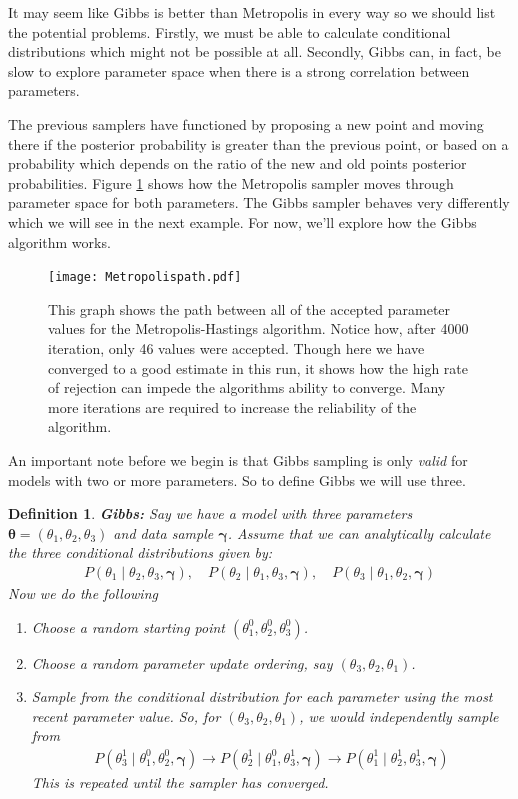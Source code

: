\documentclass[12pt,twoside]{report}   %
\newcommand{\bb}{\textbf}
\newcommand{\ti}{\textit}
\newtheorem{definition}[theorem]{Definition}
\begin{document}
It may seem like Gibbs is better than Metropolis in every way so we should list the potential problems. Firstly, we must be able to calculate conditional distributions which might not be possible at all. Secondly, Gibbs can, in fact, be slow to explore parameter space when there is a strong correlation between parameters.

The previous samplers have functioned by proposing a new point and moving there if the posterior probability is greater than the previous point, or based on a probability which depends on the ratio of the new and old points posterior probabilities. Figure \ref{fig3.1} shows how the Metropolis sampler moves through parameter space for both parameters. The Gibbs sampler behaves very differently which we will see in the next example. For now, we'll explore how the Gibbs algorithm works.
\begin{figure}[H]
\centering
\texttt{[image: Metropolispath.pdf]}
\caption{This graph shows the path between all of the accepted parameter values for the Metropolis-Hastings algorithm. Notice how, after 4000 iteration, only 46 values were accepted. Though here we have converged to a good estimate in this run, it shows how the high rate of rejection can impede the algorithms ability to converge. Many more iterations are required to increase the reliability of the algorithm.}
\label{fig3.1}
\end{figure}

An important note before we begin is that Gibbs sampling is only \ti{valid} for models with two or more parameters. So to define Gibbs we will use three.
\vspace{7pt}
\begin{definition}\label{gibbs def}
\bb{Gibbs:} Say we have a model with three parameters $\bm{\theta} = (\theta_1, \theta_2, \theta_3)$ and data sample $\bm{\gamma}$. Assume that we can analytically calculate the three conditional distributions given by:
\begin{align*}
P(\theta_1\mid\theta_2, \theta_3,\bm{\gamma}),\quad P(\theta_2\mid\theta_1, \theta_3,\bm{\gamma}),\quad P(\theta_3\mid\theta_1, \theta_2,\bm{\gamma})
\end{align*}
Now we do the following
\begin{enumerate}
\item Choose a random starting point $(\theta_1^0, \theta_2^0, \theta_3^0)$.
\item Choose a random parameter update ordering, say $(\theta_3, \theta_2, \theta_1)$.
\item Sample from the conditional distribution for each parameter using the most recent parameter value. So, for $(\theta_3, \theta_2, \theta_1)$, we would independently sample from
\begin{align*}
P(\theta_3^1\mid\theta_1^0, \theta_2^0,\bm{\gamma})\rightarrow P(\theta_2^1\mid\theta_1^0, \theta_3^1,\bm{\gamma})\rightarrow P(\theta_1^1\mid\theta_2^1, \theta_3^1,\bm{\gamma})
\end{align*}
This is repeated until the sampler has converged.
\end{enumerate}
\end{definition}
\end{document}
